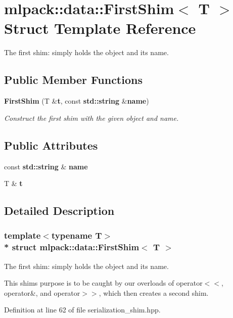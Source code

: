 \section{mlpack\+:\+:data\+:\+:First\+Shim$<$ T $>$ Struct Template Reference}
\label{structmlpack_1_1data_1_1FirstShim}


The first shim\+: simply holds the object and its name.  


\subsection*{Public Member Functions}
\begin{DoxyCompactItemize}
\item 
{\bf First\+Shim} (T \&{\bf t}, const {\bf std\+::string} \&{\bf name})
\begin{DoxyCompactList}\small\item\em Construct the first shim with the given object and name. \end{DoxyCompactList}\end{DoxyCompactItemize}
\subsection*{Public Attributes}
\begin{DoxyCompactItemize}
\item 
const {\bf std\+::string} \& {\bf name}
\item 
T \& {\bf t}
\end{DoxyCompactItemize}


\subsection{Detailed Description}
\subsubsection*{template$<$typename T$>$\\*
struct mlpack\+::data\+::\+First\+Shim$<$ T $>$}

The first shim\+: simply holds the object and its name. 

This shim\textquotesingle{}s purpose is to be caught by our overloads of operator$<$$<$, operator\&, and operator$>$$>$, which then creates a second shim. 

Definition at line 62 of file serialization\+\_\+shim.\+hpp.



